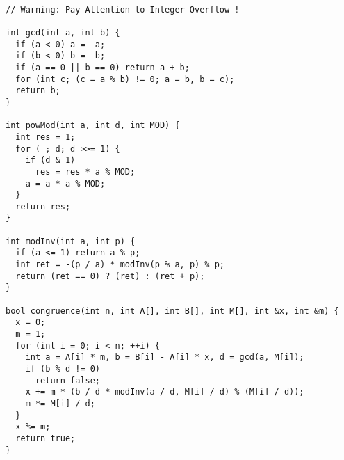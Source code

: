 \begin{lstlisting}

// Warning: Pay Attention to Integer Overflow !

int gcd(int a, int b) {
  if (a < 0) a = -a;
  if (b < 0) b = -b;
  if (a == 0 || b == 0) return a + b;
  for (int c; (c = a % b) != 0; a = b, b = c);
  return b;
}

int powMod(int a, int d, int MOD) {
  int res = 1;
  for ( ; d; d >>= 1) {
    if (d & 1)
      res = res * a % MOD;
    a = a * a % MOD;
  }
  return res;
}

int modInv(int a, int p) {
  if (a <= 1) return a % p;
  int ret = -(p / a) * modInv(p % a, p) % p;
  return (ret == 0) ? (ret) : (ret + p);
}

bool congruence(int n, int A[], int B[], int M[], int &x, int &m) {
  x = 0;
  m = 1;
  for (int i = 0; i < n; ++i) {
    int a = A[i] * m, b = B[i] - A[i] * x, d = gcd(a, M[i]);
    if (b % d != 0)
      return false;
    x += m * (b / d * modInv(a / d, M[i] / d) % (M[i] / d));
    m *= M[i] / d;
  }
  x %= m;
  return true;
}

\end{lstlisting}